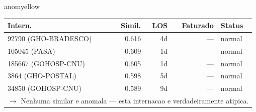\documentclass[a4paper,10pt]{article}
\begin{document}
\begin{anomalycard}[Internacao 8616 | GHO-PETROBRAS | MODERADO (z=2.46)]{anomyellow}
\begin{tabular}{l r r r l}\toprule\textbf{Intern.} & \textbf{Simil.} & \textbf{LOS} & \textbf{Faturado} & \textbf{Status} \\\midrule
92790 (GHO-BRADESCO) & 0.616 & 4d & --- & \textcolor{jcubeblue}{normal} \\
105045 (PASA) & 0.609 & 1d & --- & \textcolor{jcubeblue}{normal} \\
185667 (GOHOSP-CNU) & 0.605 & 1d & --- & \textcolor{jcubeblue}{normal} \\
3864 (GHO-POSTAL) & 0.598 & 5d & --- & \textcolor{jcubeblue}{normal} \\
34850 (GOHOSP-CNU) & 0.589 & 9d & --- & \textcolor{jcubeblue}{normal} \\
\multicolumn{5}{l}{\textcolor{jcubeblue}{\small $\rightarrow$ Nenhuma similar e anomala --- esta internacao e verdadeiramente atipica.}} \\
\bottomrule\end{tabular}


\end{anomalycard}

\newpage
\end{document}
